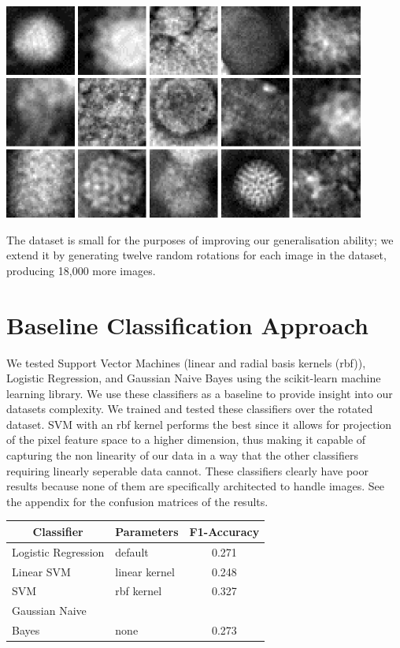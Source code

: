 \begin{multicols}{2}
\begin{Figure}
	\centering
	\includegraphics[width=0.85\linewidth]{images/dataset_sample.png}
	\label{fig:lbp_basic}
\end{Figure}

The dataset is small for the purposes of improving our generalisation ability; we extend it by generating twelve random rotations for each image in the dataset, producing 18,000 more images.

\section{Baseline Classification Approach}
We tested Support Vector Machines (linear and radial basis kernels (rbf)), Logistic Regression, and Gaussian Naive Bayes using the scikit-learn \citet{scikit-learn} machine learning library. We use these classifiers as a baseline to provide insight into our datasets complexity. We trained and tested these classifiers over the rotated dataset. SVM with an rbf kernel performs the best since it allows for projection of the pixel feature space to a higher dimension, thus making it capable of capturing the non linearity of our data in a way that the other classifiers requiring linearly seperable data cannot. These classifiers clearly have poor results because none of them are specifically architected to handle images. See the appendix for the confusion matrices of the results.

\begin{center}
	\begin{tabular}{llc}
	\toprule
	\multicolumn{1}{c}{\textbf{Classifier}} & \textbf{Parameters} & \textbf{F1-Accuracy} \\ 
	\midrule
	Logistic Regression  & default         & 0.271 \\ 
	Linear 	SVM   	     & linear kernel   & 0.248 \\
	SVM                  & rbf kernel      & 0.327 \\
	Gaussian Naive \\Bayes & none            & 0.273 \\ \bottomrule
	\end{tabular}
\end{center}


\end{multicols}
